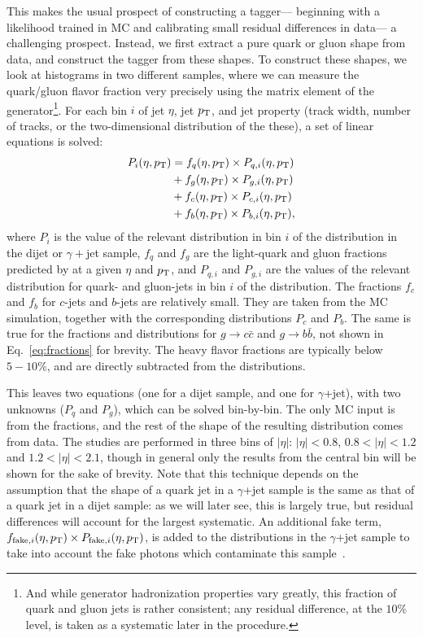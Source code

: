 This makes the usual prospect of constructing a tagger--- beginning with a likelihood trained in MC and calibrating small residual differences in data--- a challenging prospect. Instead, we first extract a pure quark or gluon shape from data, and construct the tagger from these shapes. To construct these shapes, we look at histograms in two different samples, where we can measure the quark/gluon flavor fraction very precisely using the matrix element of the generator\footnote{And while generator hadronization properties vary greatly, this fraction of quark and gluon jets is rather consistent; any residual difference, at the $10\%$ level, is taken as a systematic later in the procedure.}. For each bin $i$ of jet $\eta$, jet $p_{\text{T}}$, and jet property (track width, number of tracks, or the two-dimensional distribution of the these), a set of linear equations is solved:
%
\begin{align}
P_i(\eta,p_{\text{T}}) &= f_{q}(\eta,p_{\text{T}}) \times P_{q,i}(\eta,p_{\text{T}}) \nonumber \\
	& + f_{g}(\eta,p_{\text{T}}) \times P_{g,i}(\eta,p_{\text{T}}) \nonumber \\
& + f_{c}(\eta,p_{\text{T}}) \times P_{c,i}(\eta,p_{\text{T}}) \nonumber \\
& + f_{b}(\eta,p_{\text{T}}) \times P_{b,i}(\eta,p_{\text{T}}) , 
\label{eq:fractions}
\end{align}
%
where $P_i$ is the value of the relevant distribution in bin $i$ of the distribution in the dijet
or $\gamma+$jet sample, $f_{q}$ and $f_{g}$ are the light-quark and gluon fractions 
predicted by \Pythia at a given $\eta$ and $p_{\text{T}}$, 
and $P_{q,i}$ and $P_{g,i}$ are the values of the relevant distribution 
for quark- and gluon-jets in bin $i$ of the distribution. The fractions 
$f_{c}$ and $f_{b}$ for $c$-jets and $b$-jets are relatively small. They are taken from the
MC simulation, together with the corresponding distributions $P_{c}$ and $P_{b}$.
The same is true for the fractions and distributions for $g\rightarrow c\bar{c}$ and $g\rightarrow b\bar{b}$,
not shown in Eq.~\ref{eq:fractions} for brevity. The heavy flavor fractions are typically below $5-10\%$, and are directly subtracted from the distributions.

This leaves two equations (one for a dijet sample, and one for $\gamma$+jet), with two unknowns ($P_{q}$ and $P_{g}$), which can be solved bin-by-bin. The only MC input is from the fractions, and the rest of the shape of the resulting distribution comes from data. The studies are performed in three bins of $|\eta|$: $|\eta|<0.8$, $0.8<|\eta|<1.2$ and $1.2<|\eta|<2.1$, though in general only the results from the central bin will be shown for the sake of brevity. Note that this technique depends on the assumption that the shape of a quark jet in a $\gamma$+jet sample is the same as that of a quark jet in a dijet sample: as we will later see, this is largely true, but residual differences will account for the largest systematic. An additional fake term,  $f_{{\rm fake}, i}(\eta,p_{\text{T}})\times P_{{\rm fake}, i}(\eta,p_{\text{T}})$, is added to the distributions in the $\gamma$+jet sample to take into account the fake photons which contaminate this sample~\cite{JES2011}.


